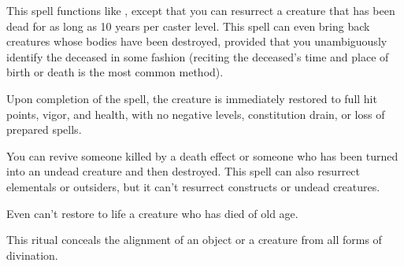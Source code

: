 \begin{spelleffect}
This spell functions like , except that you can resurrect a creature that has been dead for as long as 10 years per caster level. This spell can even bring back creatures whose bodies have been destroyed, provided that you unambiguously identify the deceased in some fashion (reciting the deceased's time and place of birth or death is the most common method).
\par Upon completion of the spell, the creature is immediately restored to full hit points, vigor, and health, with no negative levels, constitution drain, or loss of prepared spells.
\par You can revive someone killed by a death effect or someone who has been turned into an undead creature and then destroyed. This spell can also resurrect elementals or outsiders, but it can't resurrect constructs or undead creatures.
\end{spelleffect}
\begin{spellnotes}
Even  can't restore to life a creature who has died of old age.
\end{spellnotes}

\spellrng{\rngclose}
\begin{spelleffect}
This ritual conceals the alignment of an object or a creature from all forms of divination.
\end{spelleffect}

